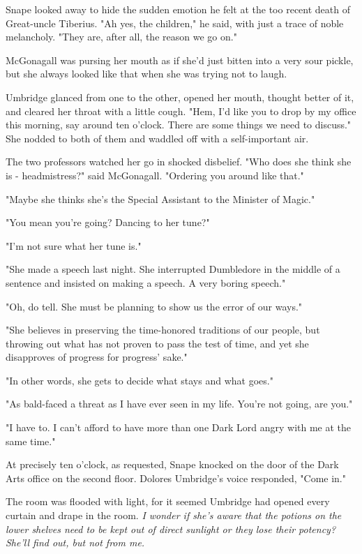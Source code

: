 \documentclass[a4paper,11pt]{article}
\begin{document}
Snape looked away to hide the sudden emotion he felt at the too recent death of Great-uncle Tiberius. "Ah yes, the children," he said, with just a trace of noble melancholy. "They are, after all, the reason we go on."

McGonagall was pursing her mouth as if she'd just bitten into a very sour pickle, but she always looked like that when she was trying not to laugh.

Umbridge glanced from one to the other, opened her mouth, thought better of it, and cleared her throat with a little cough. "Hem, I'd like you to drop by my office this morning, say around ten o'clock. There are some things we need to discuss." She nodded to both of them and waddled off with a self-important air.

The two professors watched her go in shocked disbelief. "Who does she think she is - headmistress?" said McGonagall. "Ordering you around like that."

"Maybe she thinks she's the Special Assistant to the Minister of Magic."

"You mean you're going? Dancing to her tune?"

"I'm not sure what her tune is."

"She made a speech last night. She interrupted Dumbledore in the middle of a sentence and insisted on making a speech. A very boring speech."

"Oh, do tell. She must be planning to show us the error of our ways."

"She believes in preserving the time-honored traditions of our people, but throwing out what has not proven to pass the test of time, and yet she disapproves of progress for progress' sake."

"In other words, she gets to decide what stays and what goes."

"As bald-faced a threat as I have ever seen in my life. You're not going, are you."

"I have to. I can't afford to have more than one Dark Lord angry with me at the same time."

At precisely ten o'clock, as requested, Snape knocked on the door of the Dark Arts office on the second floor. Dolores Umbridge's voice responded, "Come in."

The room was flooded with light, for it seemed Umbridge had opened every curtain and drape in the room. \emph{I wonder if she's aware that the potions on the lower shelves need to be kept out of direct sunlight or they lose their potency? She'll find out, but not from me.}
\end{document}
